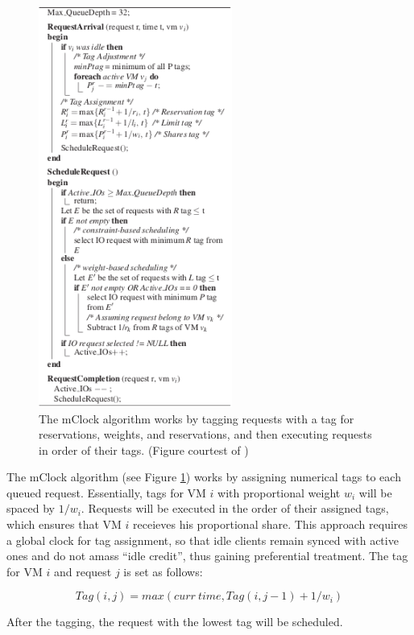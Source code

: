 \documentclass[letterpaper, twocolumn]{article}
\begin{document}
\begin{figure}[t]
	\begin{center}
		\includegraphics[width=2.5in]{images/mclock.png}
	\end{center}
	\caption{The mClock algorithm works by tagging requests with a tag for
		reservations, weights, and reservations, and then executing requests
		in order of their tags.  (Figure courtest of \cite{ref:mclock})}
	\label{fig:mclock-alg}
\end{figure}

The mClock algorithm (see Figure \ref{fig:mclock-alg}) works by assigning numerical tags to each
queued request.
Essentially, tags for VM $i$ with proportional weight $w_i$ will be spaced by $1/w_i$.
Requests will be executed in the order of their assigned tags, which ensures that
VM $i$ receieves his proportional share.  This approach requires a global clock
for tag assignment, so that idle clients remain synced with active ones and do not
amass ``idle credit'', thus gaining preferential treatment.  The tag for VM $i$ and
request $j$ is set as follows:

\[
	Tag(i, j) = max(curr~time, Tag(i, j-1) + 1/w_i)
\]

After the tagging, the request with the lowest tag will be scheduled.
\end{document}
